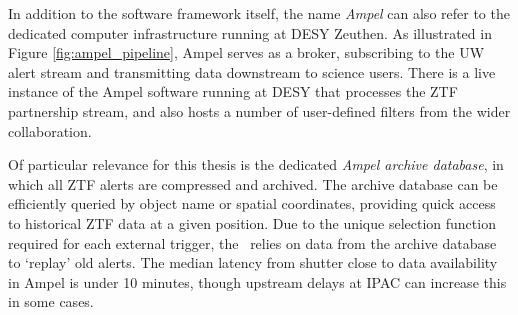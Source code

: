 In addition to the software framework itself, the name \emph{Ampel} can also refer to the dedicated computer infrastructure running at DESY Zeuthen. As illustrated in Figure \ref{fig:ampel_pipeline}, Ampel serves as a broker, subscribing to the UW alert stream and transmitting data downstream to science users. There is a live instance of the Ampel software running at DESY that processes the ZTF partnership stream, and also hosts a number of user-defined filters from the wider collaboration. 

Of particular relevance for this thesis is the dedicated \emph{Ampel archive database}, in which all ZTF alerts are compressed and archived. The archive database can be efficiently queried by object name or spatial coordinates, providing quick access to historical ZTF data at a given position. Due to the unique selection function required for each external trigger, the \ztf ~relies on data from the archive database to `replay' old alerts. The median latency from shutter close to data availability in Ampel is under 10 minutes, though upstream delays at IPAC can increase this in some cases.
